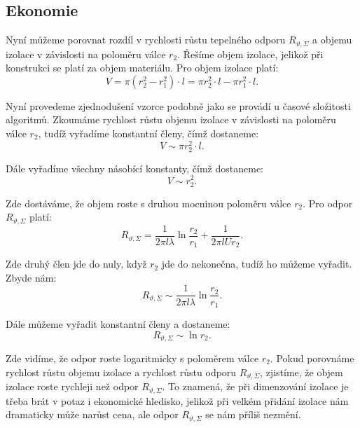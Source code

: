 \documentclass{article}
\begin{document}
\subsection{Ekonomie}

Nyní můžeme porovnat rozdíl v rychlosti růstu tepelného odporu $R_{\vartheta,\Sigma}$ a objemu izolace v závislosti na poloměru válce $r_2$. Řešíme objem izolace, jelikož při konstrukci se platí za objem materiálu. Pro objem izolace platí:
$$
    V = \pi (r_2^2 - r_1^2) \cdot l = \pi r_2^2 \cdot l - \pi r_1^2 \cdot l.
$$

Nyní provedeme zjednodušení vzorce podobně jako se provádí u časové složitosti algoritmů. Zkoumáme rychlost růstu objemu izolace v závislosti na poloměru válce $r_2$, tudíž vyřadíme konstantní členy, čímž dostaneme:
$$
    V \sim \pi r_2^2 \cdot l.
$$

Dále vyřadíme všechny násobící konstanty, čímž dostaneme:
$$
    V \sim r_2^2.
$$

Zde dostáváme, že objem roste s druhou mocninou poloměru válce $r_2$. Pro odpor $R_{\vartheta,\Sigma}$ platí:
$$
    R_{\vartheta,\Sigma} = \frac{1}{2 \pi l \lambda} \ln \frac{r_2}{r_1} + \frac{1}{2 \pi l U r_2}.
$$

Zde druhý člen jde do nuly, když $r_2$ jde do nekonečna, tudíž ho můžeme vyřadit. Zbyde nám:
$$
    R_{\vartheta,\Sigma} \sim \frac{1}{2 \pi l \lambda} \ln \frac{r_2}{r_1}.
$$

Dále můžeme vyřadit konstantní členy a dostaneme:
$$
    R_{\vartheta,\Sigma} \sim \ln r_2.
$$

Zde vidíme, že odpor roste logaritmicky s poloměrem válce $r_2$. Pokud porovnáme rychlost růstu objemu izolace a rychlost růstu odporu $R_{\vartheta,\Sigma}$, zjistíme, že objem izolace roste rychleji než odpor $R_{\vartheta,\Sigma}$. To znamená, že při dimenzování izolace je třeba brát v potaz i ekonomické hledisko, jelikož při velkém přidání izolace nám dramaticky může narůst cena, ale odpor $R_{\vartheta,\Sigma}$ se nám příliš nezmění.

\begin{center}
\end{center}
\end{document}
